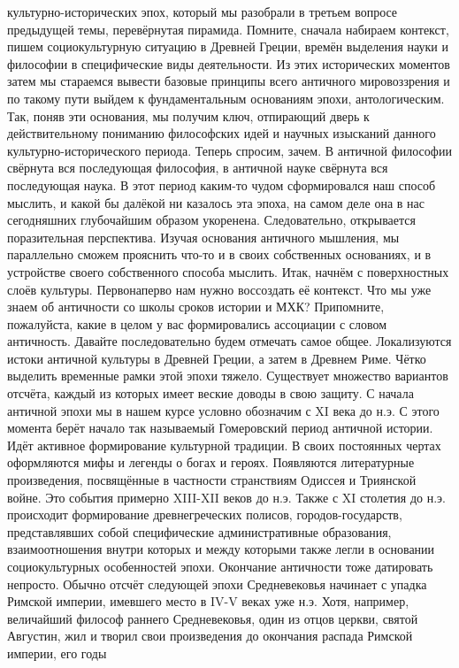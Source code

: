 культурно-исторических эпох, который мы разобрали в третьем вопросе предыдущей
темы, перевёрнутая пирамида. Помните, сначала набираем контекст, пишем
социокультурную ситуацию в Древней Греции, времён выделения науки и философии в
специфические виды деятельности. Из этих исторических моментов затем мы
стараемся вывести базовые принципы всего античного мировоззрения и по такому
пути выйдем к фундаментальным основаниям эпохи, антологическим. Так, поняв эти
основания, мы получим ключ, отпирающий дверь к действительному пониманию
философских идей и научных изысканий данного культурно-исторического периода.
Теперь спросим, зачем. В античной философии свёрнута вся последующая философия,
в античной науке свёрнута вся последующая наука. В этот период каким-то чудом
сформировался наш способ мыслить, и какой бы далёкой ни казалось эта эпоха, на
самом деле она в нас сегодняшних глубочайшим образом укоренена. Следовательно,
открывается поразительная перспектива. Изучая основания античного мышления, мы
параллельно сможем прояснить что-то и в своих собственных основаниях, и в
устройстве своего собственного способа мыслить. Итак, начнём с поверхностных
слоёв культуры. Первонаперво нам нужно воссоздать её контекст. Что мы уже знаем
об античности со школы сроков истории и МХК? Припомните, пожалуйста, какие в
целом у вас формировались ассоциации с словом античность. Давайте
последовательно будем отмечать самое общее. Локализуются истоки античной
культуры в Древней Греции, а затем в Древнем Риме. Чётко выделить временные
рамки этой эпохи тяжело. Существует множество вариантов отсчёта, каждый из
которых имеет веские доводы в свою защиту. С начала античной эпохи мы в нашем
курсе условно обозначим с XI века до н.э. С этого момента берёт начало так
называемый Гомеровский период античной истории. Идёт активное формирование
культурной традиции. В своих постоянных чертах оформляются мифы и легенды о
богах и героях. Появляются литературные произведения, посвящённые в частности
странствиям Одиссея и Триянской войне. Это события примерно XIII-XII веков до
н.э. Также с XI столетия до н.э. происходит формирование древнегреческих
полисов, городов-государств, представлявших собой специфические административные
образования, взаимоотношения внутри которых и между которыми также легли в
основании социокультурных особенностей эпохи. Окончание античности тоже
датировать непросто. Обычно отсчёт следующей эпохи Средневековья начинает с
упадка Римской империи, имевшего место в IV-V веках уже н.э. Хотя, например,
величайший философ раннего Средневековья, один из отцов церкви, святой Августин,
жил и творил свои произведения до окончания распада Римской империи, его годы
